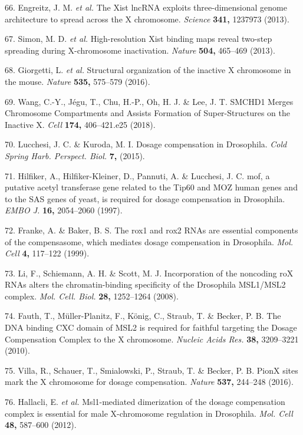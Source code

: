 \documentclass[11pt,twoside]{MPIthesis}
\theoremstyle{definition}
\theoremstyle{definition}
\theoremstyle{definition}
\theoremstyle{remark}
\begin{document}
66. Engreitz, J. M. \emph{et al.} The Xist lncRNA exploits
three-dimensional genome architecture to spread across the X chromosome.
\emph{Science} \textbf{341,} 1237973 (2013).

67. Simon, M. D. \emph{et al.} High-resolution Xist binding maps reveal
two-step spreading during X-chromosome inactivation. \emph{Nature}
\textbf{504,} 465--469 (2013).

68. Giorgetti, L. \emph{et al.} Structural organization of the inactive
X chromosome in the mouse. \emph{Nature} \textbf{535,} 575--579 (2016).

69. Wang, C.-Y., Jégu, T., Chu, H.-P., Oh, H. J. \& Lee, J. T. SMCHD1
Merges Chromosome Compartments and Assists Formation of Super-Structures
on the Inactive X. \emph{Cell} \textbf{174,} 406--421.e25 (2018).

70. Lucchesi, J. C. \& Kuroda, M. I. Dosage compensation in Drosophila.
\emph{Cold Spring Harb. Perspect. Biol.} \textbf{7,} (2015).

71. Hilfiker, A., Hilfiker-Kleiner, D., Pannuti, A. \& Lucchesi, J. C.
mof, a putative acetyl transferase gene related to the Tip60 and MOZ
human genes and to the SAS genes of yeast, is required for dosage
compensation in Drosophila. \emph{EMBO J.} \textbf{16,} 2054--2060
(1997).

72. Franke, A. \& Baker, B. S. The rox1 and rox2 RNAs are essential
components of the compensasome, which mediates dosage compensation in
Drosophila. \emph{Mol. Cell} \textbf{4,} 117--122 (1999).

73. Li, F., Schiemann, A. H. \& Scott, M. J. Incorporation of the
noncoding roX RNAs alters the chromatin-binding specificity of the
Drosophila MSL1/MSL2 complex. \emph{Mol. Cell. Biol.} \textbf{28,}
1252--1264 (2008).

74. Fauth, T., Müller-Planitz, F., König, C., Straub, T. \& Becker, P.
B. The DNA binding CXC domain of MSL2 is required for faithful targeting
the Dosage Compensation Complex to the X chromosome. \emph{Nucleic Acids
Res.} \textbf{38,} 3209--3221 (2010).

75. Villa, R., Schauer, T., Smialowski, P., Straub, T. \& Becker, P. B.
PionX sites mark the X chromosome for dosage compensation. \emph{Nature}
\textbf{537,} 244--248 (2016).

76. Hallacli, E. \emph{et al.} Msl1-mediated dimerization of the dosage
compensation complex is essential for male X-chromosome regulation in
Drosophila. \emph{Mol. Cell} \textbf{48,} 587--600 (2012).
\end{document}
